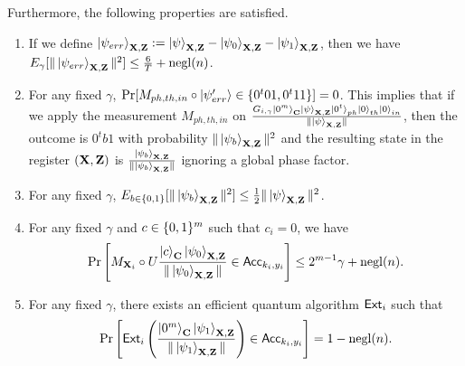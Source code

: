 \begin{lemma}
Furthermore, the following properties are satisfied.
%
\begin{enumerate}
    \item \label{partition-property-1} If we define $\ket{\psi_{err}}_{\mathbf{X},\mathbf{Z}}:= \ket{\psi}_{\mathbf{X},\mathbf{Z}} - \ket{\psi_{0}}_{\mathbf{X},\mathbf{Z}}- \ket{\psi_{1}}_{\mathbf{X},\mathbf{Z}}$, then we have  $E_{\gamma}[\|\ket{\psi_{err}}_{\mathbf{X},\mathbf{Z}}\|^2]\leq \frac{6}{T}+\operatorname{negl}(n)$. 
\item For any fixed $\gamma$, $\Pr[M_{ph,th,in}\circ \ket{\psi'_{err}} \in \{0^t01,0^t11\}] =0$. %
This implies that if we apply the measurement $M_{ph,th,in}$ on $\frac{G_{i,\gamma} \ket{0^m}_{\mathbf{C}}\ket{\psi}_{\mathbf{X},\mathbf{Z}}\ket{0^t}_{ph}\ket{0}_{th}\ket{0}_{in}}{\|\ket{\psi}_{\mathbf{X},\mathbf{Z}}\|}$, then the outcome is $0^tb1$ with probability $\|\ket{\psi_b}_{\mathbf{X},\mathbf{Z}}\|^2$ and the resulting state in the register $(\mathbf{X},\mathbf{Z})$  is $\frac{\ket{\psi_b}_{\mathbf{X},\mathbf{Z}}}{\|\ket{\psi_b}_{\mathbf{X},\mathbf{Z}}\|}$ ignoring a global phase factor.
    \item For any fixed $\gamma$, $E_{b\in \{0,1\}} [\|\ket{\psi_b}_{\mathbf{X},\mathbf{Z}}\|^2]\leq \frac{1}{2}\|\ket{\psi}_{\mathbf{X},\mathbf{Z}}\|^2$. 
        \item 
For any fixed $\gamma$ and $c\in \{0,1\}^m$ such that $c_i=0$, we have 
\begin{align*}
\Pr\left[M_{\mathbf{X}_i}\circ U\frac{\ket{c}_{\mathbf{C}}\ket{\psi_0}_{\mathbf{X},\mathbf{Z}}}{\|\ket{\psi_0}_{\mathbf{X},\mathbf{Z}}\|}\in \mathsf{Acc}_{k_i,y_i}\right]\leq 2^{m-1}\gamma+\operatorname{negl}(n).
\end{align*}
    \item 
For any fixed $\gamma$, there exists an efficient quantum algorithm $\mathsf{Ext}_i$ such that 
\begin{align*}  
  \Pr\left[\mathsf{Ext}_i\left(\frac{\ket{0^m}_{\mathbf{C}}\ket{\psi_1}_{\mathbf{X},\mathbf{Z}}}{\|\ket{\psi_1}_{\mathbf{X},\mathbf{Z}}\|}\right)\in \mathsf{Acc}_{k_i,y_i}\right]=1-\operatorname{negl}(n).
  \end{align*}   
\end{enumerate}
\end{lemma}

